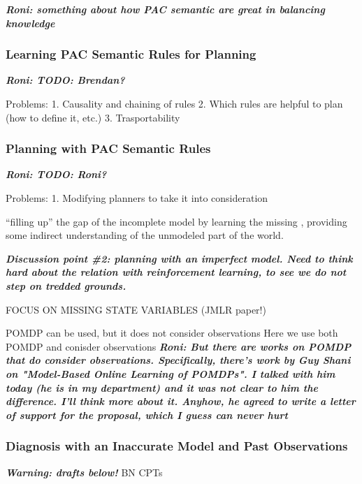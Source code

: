 \documentclass[12pt]{article}
\newcommand{\note}[1]{\textbf{\textit{#1}}}
\begin{document}
\note{Roni: something about how PAC semantic are great in balancing knowledge}


\subsubsection{Learning PAC Semantic Rules for Planning}
\note{Roni: TODO: Brendan?}


Problems: 
1. Causality and chaining of rules
2. Which rules are helpful to plan (how to define it, etc.)
3. Trasportability

\subsubsection{Planning with PAC Semantic Rules}
\note{Roni: TODO: Roni?}

Problems:
1. Modifying planners to take it into consideration







``filling up'' the gap of the incomplete model by learning the missing , providing some indirect understanding of the unmodeled part of the world. 


\note{Discussion point \#2: planning with an imperfect model. Need to think hard about the relation with reinforcement learning, to see we do not step on tredded grounds.}

FOCUS ON MISSING STATE VARIABLES (JMLR paper!)


POMDP can be used, but it does not consider observations
Here we use both POMDP and conisder observations
\note{Roni: But there are works on POMDP that do consider observations. Specifically, there's work by Guy Shani on "Model-Based Online Learning of POMDPs". I talked with him today (he is in my department) and it was not clear to him the difference. I'll think more about it. Anyhow, he agreed to write a letter of support for the proposal, which I guess can never hurt}







\subsubsection{Diagnosis with an Inaccurate Model and Past Observations}
\note{Warning: drafts below!}
BN 
CPTs
\end{document}
